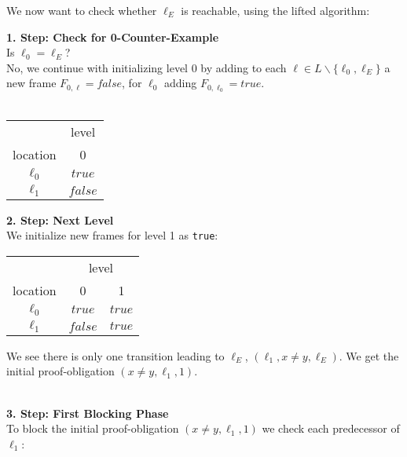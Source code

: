 \documentclass{article}
\begin{document}
	We now want to check whether $\ell_E$ is reachable, using the lifted algorithm: \par
	
	\textbf{1. Step: Check for 0-Counter-Example} \\
	Is $\ell_0 = \ell_E$? \\
	No, we continue with initializing level 0 by adding to each $\ell \in L \backslash \{\ell_0, \ell_E\}$ a new frame $F_{0, \ell} = false$, for $\ell_0$ adding $F_{0, \ell_0} = true$. \\ \\
	
	
	\setlength\tabcolsep{0.35em}
	\begin{center}
		\begin{tabu}{cc}
			\toprule
			& level \\
			\cmidrule(lr){2-2}
			location & 0 \\
			$\ell_0$ & $true$ \\
			$\ell_1$ & $false$ \\
			\bottomrule
		\end{tabu}
	\end{center}
	
	\hspace*{5cm}
	
	
	\textbf{2. Step: Next Level} \\
	We initialize new frames for level 1 as \texttt{true}: \\
	
	\begin{center}
		\begin{tabu}{ccc}
			\toprule
			& \multicolumn{2}{c}{level} \\ 
			\cmidrule(lr){2-3}
			location & 0 & 1 \\
			\cmidrule{1-3}
			$\ell_0$ & $true$ & $true$ \\
			$\ell_1$ & $false$ & $true$ \\
			\bottomrule
		\end{tabu}
	\end{center}
	
	\hspace*{5cm}
	
	
	We see there is only one transition leading to $\ell_E$, $(\ell_1, x \neq y, \ell_E)$. We get the initial proof-obligation $(x \neq y, \ell_1, 1)$. \\ \\ \par
	\textbf{3. Step: First Blocking Phase} \\
	To block the initial proof-obligation $(x \neq y, \ell_1, 1)$ we check each predecessor of $\ell_1$:
	
\end{document}
